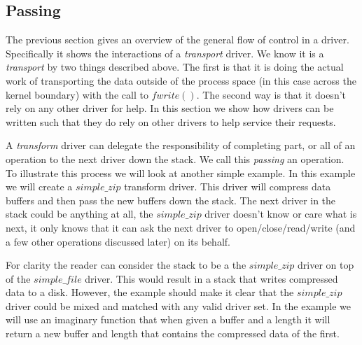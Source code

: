 \documentclass[11pt]{article}
\begin{document}
\subsection{Passing}
The previous section gives an overview of the general flow of control
in a driver.  Specifically it shows the interactions of a \emph{transport}
driver.  We know it is a \emph{transport} by two things described above.
The first is that it is doing the actual work of transporting the data
outside of the process space (in this case across the kernel boundary) 
with the call to $fwrite()$.  The second way is that it doesn't rely
on any other driver for help.  In this section we show how drivers 
can be written such that they do rely on other drivers to help service
their requests.

A \emph{transform} driver can delegate the responsibility of completing
part, or all of an operation to the next driver down the stack.  We call
this \emph{passing} an operation.  To illustrate this process we will
look at another simple example.  
In this example we will create a $simple\_zip$ transform driver.  This
driver will compress data buffers and then pass the new buffers down the 
stack.  The next driver in the stack could be anything at all, the 
$simple\_zip$ driver doesn't know or care what is next, it only knows
that it can ask the next driver to open/close/read/write (and a few other 
operations discussed later) on its behalf.

For clarity the reader can consider the stack to be a the $simple\_zip$
driver on top of the $simple\_file$ driver.  This would result in a stack
that writes compressed data to a disk.  However, the example should make it
clear that the $simple\_zip$ driver could be mixed and matched with any 
valid driver set.  In the example we will use an imaginary function that 
when given a buffer and a length it will return a new buffer and length
that contains the compressed data of the first.
\end{document}
